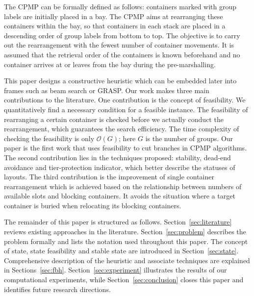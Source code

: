 \documentclass[review,3p,times,12pt,number]{elsarticle}\usepackage{amsmath}\usepackage{amssymb}
\begin{document}
The CPMP can be formally defined as follows: containers marked with group labels are initially placed in a bay. The CPMP aims at rearranging these containers within the bay, so that containers in each stack are placed in a descending order of group labels from bottom to top. The objective is to carry out the rearrangement with the fewest number of container movements.
It is assumed that the retrieval order of the containers is known beforehand and no container arrives at or leaves from the bay during the pre-marshalling.

This paper designs a constructive heuristic which can be embedded later into frames such as beam search or GRASP\@.
Our work makes three main contributions to the literature.
One contribution is the concept of feasibility. We quantitatively find a necessary condition for a feasible instance.
The feasibility of rearranging a certain container is checked before we actually conduct the rearrangement, which guarantees the search efficiency.
The time complexity of checking the feasibility is only $\mathcal O(G)$; here $G$ is the number of groups. Our paper is the first work that uses feasibility to cut branches in CPMP algorithms.
The second contribution lies in the techniques proposed: stability, dead-end avoidance and tier-protection indicator, which better describe the statuses of layouts.
The third contribution is the improvement of single container rearrangement which is achieved based on the relationship between numbers of available slots and blocking containers. It avoids the situation where a target container is buried when relocating its blocking containers.

The remainder of this paper is structured as follows. Section~\ref{sec:literature} reviews existing approaches in the literature. Section~\ref{sec:problem} describes the problem formally and lists the notation used throughout this paper. The concept of state, state feasibility and stable state are introduced in Section~\ref{sec:state}.
Comprehensive description of the heuristic and associate techniques are explained in Sections~\ref{sec:fbh}. Section~\ref{sec:experiment} illustrates the results of our computational experiments, while Section~\ref{sec:conclusion} closes this paper and identifies future research directions.
\end{document}
